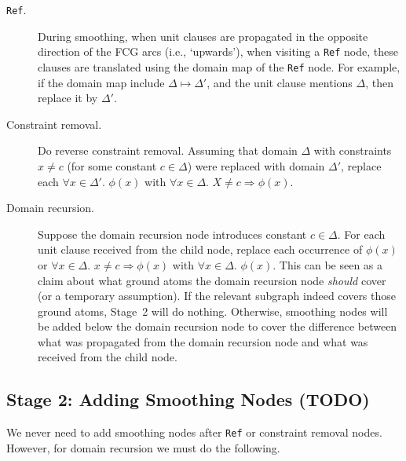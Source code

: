 \documentclass{article}
\theoremstyle{definition}
\begin{document}
\begin{description}
  \item[\texttt{Ref}.] During smoothing, when unit clauses are propagated in the
        opposite direction of the FCG arcs (i.e., `upwards'), when visiting a
        \texttt{Ref} node, these clauses are translated using the domain map of
        the \texttt{Ref} node. For example, if the domain map include
        $\Delta \mapsto \Delta'$, and the unit clause mentions $\Delta$, then
        replace it by $\Delta'$.
  \item[Constraint removal.] Do reverse constraint removal. Assuming that
        domain $\Delta$ with constraints $x \ne c$ (for some constant
        $c \in \Delta$) were replaced with domain $\Delta'$, replace each
        $\forall x \in \Delta'\text{. }\phi(x)$ with
        $\forall x \in \Delta\text{. }X \ne c \Rightarrow \phi(x)$.
  \item[Domain recursion.] Suppose the domain recursion node introduces constant
        $c \in \Delta$. For each unit clause received from the child node,
        replace each occurrence of $\phi(x)$ or $\forall x \in \Delta\text{.
        } x \ne c \Rightarrow \phi(x)$ with $\forall x \in \Delta\text{.
        }\phi(x)$. This can be seen as a claim about what ground atoms the
        domain recursion node \emph{should} cover (or a temporary assumption).
        If the relevant subgraph indeed covers those ground atoms, Stage~2 will
        do nothing. Otherwise, smoothing nodes will be added below the domain
        recursion node to cover the difference between what was propagated from
        the domain recursion node and what was received from the child node.
\end{description}

\subsection{Stage 2: Adding Smoothing Nodes (TODO)}

We never need to add smoothing nodes after \texttt{Ref} or constraint removal
nodes. However, for domain recursion we must do the following.
\end{document}
